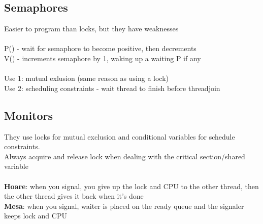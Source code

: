 \documentclass{article}
\begin{document}
\subsection{Semaphores}
Easier to program than locks, but they have weaknesses \\ \\
P() - wait for semaphore to become positive, then decrements \\ 
V() - increments semaphore by 1, waking up a waiting P if any \\ \\
Use 1: mutual exlusion (same reason as using a lock) \\ 
Use 2: scheduling constraints - wait thread to finish before threadjoin

\subsection{Monitors}
They use locks for mutual exclusion and conditional variables for schedule constraints. \\
Always acquire and release lock when dealing with the critical section/shared variable \\ \\
\textbf{Hoare}: when you signal, you give up the lock and CPU to the other thread, then the other thread gives it back when it's done \\
\textbf{Mesa}: when you signal, waiter is placed on the ready queue and the signaler keeps lock and CPU
\end{document}
